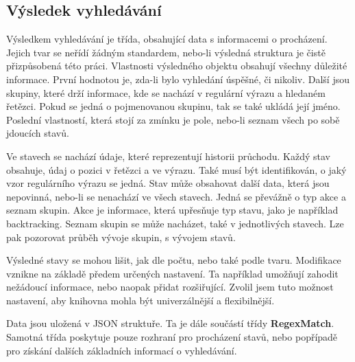\subsection*{Výsledek vyhledávání}

Výsledkem vyhledávání je třída, obsahující data s informacemi o procházení.
Jejich tvar se neřídí žádným standardem, nebo-li výsledná struktura je čistě přizpůsobená této práci.
Vlastnosti výsledného objektu obsahují všechny důležité informace.
První hodnotou je, zda-li bylo vyhledání úspěšné, či nikoliv. 
Další jsou skupiny, které drží informace, kde se nachází v regulární výrazu a hledaném řetězci. 
Pokud se jedná o pojmenovanou skupinu, tak se také ukládá její jméno. 
Poslední vlastností, která stojí za zmínku je pole, nebo-li seznam všech po sobě jdoucích stavů.

Ve stavech se nachází údaje, které reprezentují historii průchodu.
Každý stav obsahuje, údaj o pozici v řetězci a ve výrazu. 
Také musí být identifikován, o jaký vzor regulárního výrazu se jedná.
Stav může obsahovat další data, která jsou nepovinná, nebo-li se nenachází ve všech stavech.
Jedná se převážně o typ akce a seznam skupin.
Akce je informace, která upřesňuje typ stavu, jako je například backtracking.
Seznam skupin se může nacházet, také v jednotlivých stavech.
Lze pak pozorovat průběh vývoje skupin, s vývojem stavů.

Výsledné stavy se mohou lišit, jak dle počtu, nebo také podle tvaru. 
Modifikace vznikne na základě předem určených nastavení.
Ta například umožňují zahodit nežádoucí informace, nebo naopak přidat rozšiřující.
Zvolil jsem tuto možnost nastavení, aby knihovna mohla být univerzálnější a flexibilnější.

Data jsou uložená v JSON struktuře. 
Ta je dále součástí třídy \textbf{RegexMatch}.
Samotná třída poskytuje pouze rozhraní pro procházení stavů, nebo popřípadě pro získání dalších základních informací o vyhledávání.

\endinput